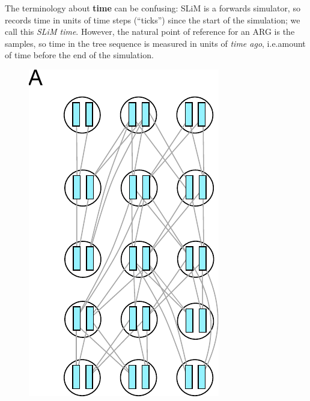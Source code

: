 \documentclass[12pt]{article}
\newcommand*{\ie}{i.e.\xcomma}
\begin{document}
The terminology about \textbf{time} can be confusing:
SLiM is a forwards simulator, so records time in units of time steps (``ticks'')
since the start of the simulation;
we call this \textit{SLiM time}.
However, the natural point of reference for an ARG is the samples,
so time in the tree sequence is measured in units of \textit{time ago},
\ie amount of time before the end of the simulation.

\begin{figure}
\centering
    \includegraphics{figures/pedigree0}

\end{figure}
\end{document}
